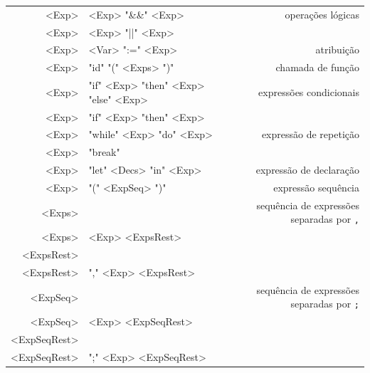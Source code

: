 \documentclass[a4paper,11pt,brazil]{article}
\begin{document}
\begin{synshorts}
\begin{longtable}{r@{$\;\rightarrow\;$}lr}
      <Exp>        & <Exp> "\&\&" <Exp>                                  & operações lógicas       \\
      <Exp>        & <Exp> "||" <Exp>                                    &                         \\[.9em]

      <Exp>        & <Var> ":=" <Exp>                                    & atribuição              \\[.9em]

      <Exp>        & "id" "(" <Exps> ")"                                 & chamada de função       \\[.9em]

      <Exp>        & "if" <Exp> "then" <Exp> "else" <Exp>                & expressões condicionais \\
      <Exp>        & "if" <Exp> "then" <Exp>                             &                         \\[.9em]

      <Exp>        & "while" <Exp> "do" <Exp>                            & expressão de repetição  \\
      <Exp>        & "break"                                             &                         \\[.9em]

      <Exp>        & "let" <Decs> "in" <Exp>                             & expressão de declaração \\[.9em]

      <Exp>        & "(" <ExpSeq> ")"                                    & expressão sequência     \\[.9em]

      <Exps>       &                                                     & sequência de expressões separadas por \verb|,| \\
      <Exps>       & <Exp> <ExpsRest>                                    &                         \\
      <ExpsRest>   &                                                     &                         \\
      <ExpsRest>   & "," <Exp> <ExpsRest>                                &                         \\[.9em]

      <ExpSeq>     &                                                     & sequência de expressões separadas por \verb|;| \\
      <ExpSeq>     & <Exp> <ExpSeqRest>                                  &                         \\
      <ExpSeqRest> &                                                     &                         \\
      <ExpSeqRest> & ";" <Exp> <ExpSeqRest>                              &                         \\[.9em]


\end{longtable}
\end{synshorts}
\end{document}

